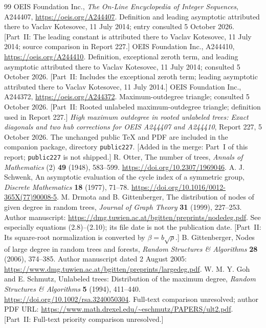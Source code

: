 \documentclass[11pt,letterpaper]{article}
\theoremstyle{definition}\newtheorem{definition}[theorem]{Definition}
\theoremstyle{remark}\newtheorem{remark}[theorem]{Remark}
\begin{document}
\begin{thebibliography}{99}
 OEIS Foundation Inc., \emph{The On-Line Encyclopedia of Integer Sequences}, A244407, \url{https://oeis.org/A244407}. Definition and leading asymptotic attributed there to Vaclav Kotesovec, 11 July 2014; entry consulted 5 October 2026. [Part~II: The leading constant is attributed there to Vaclav Kotesovec, 11 July 2014; source comparison in Report 227.]
 OEIS Foundation Inc., A244410, \url{https://oeis.org/A244410}. Definition, exceptional zeroth term, and leading asymptotic attributed there to Vaclav Kotesovec, 11 July 2014; consulted 5 October 2026. [Part~II: Includes the exceptional zeroth term; leading asymptotic attributed there to Vaclav Kotesovec, 11 July 2014.]
 OEIS Foundation Inc., A244372, \url{https://oeis.org/A244372}. Maximum-outdegree triangle; consulted 5 October 2026. [Part~II: Rooted unlabeled maximum-outdegree triangle; definition used in Report 227.]
 \emph{High maximum outdegree in rooted unlabeled trees: Exact diagonals and two hub corrections for OEIS A244407 and A244410}, Report 227, 5 October 2026. The unchanged public TeX and PDF are included in the companion package, directory \texttt{public227}. [Added in the merge: Part~I of this report; \texttt{public227} is not shipped.]
 R. Otter, The number of trees, \emph{Annals of Mathematics} (2) \textbf{49} (1948), 583--599. \url{https://doi.org/10.2307/1969046}.
 A. J. Schwenk, An asymptotic evaluation of the cycle index of a symmetric group, \emph{Discrete Mathematics} \textbf{18} (1977), 71--78. \url{https://doi.org/10.1016/0012-365X(77)90008-5}.
 M. Drmota and B. Gittenberger, The distribution of nodes of given degree in random trees, \emph{Journal of Graph Theory} \textbf{31} (1999), 227--253. Author manuscript: \url{https://dmg.tuwien.ac.at/bgitten/preprints/nodedeg.pdf}. See especially equations (2.8)--(2.10); its file date is not the publication date. [Part~II: Its square-root normalization is converted by $\beta=b\sqrt\rho$.]
 B. Gittenberger, Nodes of large degree in random trees and forests, \emph{Random Structures \& Algorithms} \textbf{28} (2006), 374--385. Author manuscript dated 2 August 2005: \url{https://www.dmg.tuwien.ac.at/bgitten/preprints/largedeg.pdf}.
 W. M. Y. Goh and E. Schmutz, Unlabeled trees: Distribution of the maximum degree, \emph{Random Structures \& Algorithms} \textbf{5} (1994), 411--440. \url{https://doi.org/10.1002/rsa.3240050304}. Full-text comparison unresolved; author PDF URL: \url{https://www.math.drexel.edu/~eschmutz/PAPERS/ult2.pdf}. [Part~II: Full-text priority comparison unresolved.]

\end{thebibliography}
\end{document}
